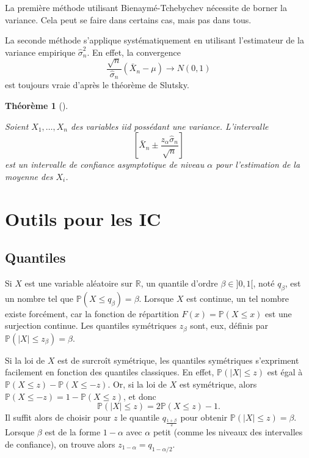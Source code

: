 \documentclass[
  10,
  letterpaper,
  DIV=11,
  numbers=noendperiod]{scrreport}
\theoremstyle{plain}
\newtheorem{theorem}{Théorème}[chapter]
\theoremstyle{definition}
\theoremstyle{plain}
\theoremstyle{definition}
\theoremstyle{definition}
\theoremstyle{plain}
\theoremstyle{remark}
\begin{document}
La première méthode utilisant Bienaymé-Tchebychev nécessite de borner la
variance. Cela peut se faire dans certains cas, mais pas dans tous.

La seconde méthode s'applique systématiquement en utilisant l'estimateur
de la variance empirique \(\hat{\sigma}_n^2\). En effet, la convergence
\[\frac{\sqrt{n}}{\hat{\sigma}_n}(\bar{X}_n - \mu) \to N(0,1)\] est
toujours vraie d'après le théorème de Slutsky.

\begin{theorem}[]\protect\hypertarget{thm-icasymptcl}{}\label{thm-icasymptcl}

Soient \(X_1, \dotsc, X_n\) des variables iid possédant une variance.
L'intervalle
\[ \left[ \bar{X}_n \pm \frac{z_\alpha \hat{\sigma}_n}{\sqrt{n}} \right]\]
est un intervalle de confiance asymptotique de niveau \(\alpha\) pour
l'estimation de la moyenne des \(X_i\).

\end{theorem}


\hypertarget{outils-pour-les-ic}{%
\chapter{Outils pour les IC}\label{outils-pour-les-ic}}

\hypertarget{sec-quantiles}{%
\section{Quantiles}\label{sec-quantiles}}

Si \(X\) est une variable aléatoire sur \(\mathbb{R}\), un quantile
d'ordre \(\beta \in ]0,1[\), noté \(q_\beta\), est un nombre tel que
\(\mathbb{P}(X \leqslant q_\beta) = \beta\). Lorsque \(X\) est continue,
un tel nombre existe forcément, car la fonction de répartition
\(F(x) = \mathbb{P}(X\leqslant x)\) est une surjection continue. Les
quantiles symétriques \(z_\beta\) sont, eux, définis par
\(\mathbb{P}(|X|\leqslant z_\beta) = \beta\).

Si la loi de \(X\) est de surcroît symétrique, les quantiles symétriques
s'expriment facilement en fonction des quantiles classiques. En effet,
\(\mathbb{P}(|X|\leqslant z)\) est égal à
\(\mathbb{P}(X \leqslant z) - \mathbb{P}(X \leqslant -z)\). Or, si la
loi de \(X\) est symétrique, alors
\(\mathbb{P}(X \leqslant -z) = 1 - \mathbb{P}(X \leqslant z)\), et donc
\[ \mathbb{P}(|X|\leqslant z) = 2\mathbb{P}(X \leqslant z) - 1.\] Il
suffit alors de choisir pour \(z\) le quantile \(q_{\frac{1+\beta}{2}}\)
pour obtenir \(\mathbb{P}(|X|\leqslant z) = \beta\). Lorsque \(\beta\)
est de la forme \(1-\alpha\) avec \(\alpha\) petit (comme les niveaux
des intervalles de confiance), on trouve alors
\(z_{1-\alpha} = q_{1 - \alpha/2}\).
\end{document}
